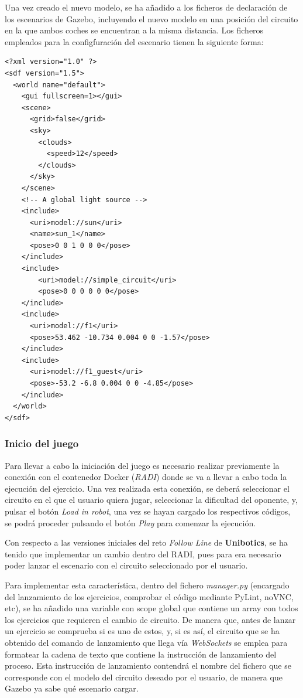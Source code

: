 \documentclass[a4paper, 12pt]{book}
\begin{document}
Una vez creado el nuevo modelo, se ha añadido a los ficheros de declaración de los escenarios de Gazebo, incluyendo el nuevo modelo en una posición del circuito en la que ambos coches se encuentran a la misma distancia. Los ficheros empleados para la configfuración del escenario tienen la siguiente forma:

\begin{lstlisting}
<?xml version="1.0" ?>
<sdf version="1.5">
  <world name="default">
    <gui fullscreen=1></gui>
    <scene>
      <grid>false</grid>
      <sky>
        <clouds>
          <speed>12</speed>
        </clouds>
      </sky>
    </scene>
    <!-- A global light source -->
    <include>
      <uri>model://sun</uri>
      <name>sun_1</name>
      <pose>0 0 1 0 0 0</pose>
    </include>
    <include>
	    <uri>model://simple_circuit</uri>
	    <pose>0 0 0 0 0 0</pose>
    </include>
    <include>
      <uri>model://f1</uri>
      <pose>53.462 -10.734 0.004 0 0 -1.57</pose>
    </include>
    <include>
      <uri>model://f1_guest</uri>
      <pose>-53.2 -6.8 0.004 0 0 -4.85</pose>
    </include>
  </world>
</sdf>
\end{lstlisting}


\subsubsection{Inicio del juego}
\label{subsec:follow_line_game_inicio}

Para llevar a cabo la iniciación del juego es necesario realizar previamente la conexión con el contenedor Docker (\emph{RADI}) donde se va a llevar a cabo toda la ejecución del ejercicio. Una vez realizada esta conexión, se deberá seleccionar el circuito en el que el usuario quiera jugar, seleccionar la dificultad del oponente, y, pulsar el botón \emph{Load in robot}, una vez se hayan cargado los respectivos códigos, se podrá proceder pulsando el botón \emph{Play} para comenzar la ejecución.

Con respecto a las versiones iniciales del reto \emph{Follow Line} de \textbf{Unibotics}, se ha tenido que implementar un cambio dentro del RADI, pues para era necesario poder lanzar el escenario con el circuito seleccionado por el usuario.

Para implementar esta característica, dentro del fichero \emph{manager.py} (encargado del lanzamiento de los ejercicios, comprobar el código mediante PyLint, noVNC, etc), se ha añadido una variable con scope global que contiene un array con todos los ejercicios que requieren el cambio de circuito. De manera que, antes de lanzar un ejercicio se comprueba si es uno de estos, y, si es así, el circuito que se ha obtenido del comando de lanzamiento que llega vía \emph{WebSockets} se emplea para formatear la cadena de texto que contiene la instrucción de lanzamiento del proceso. Esta instrucción de lanzamiento contendrá el nombre del fichero que se corresponde con el modelo del circuito deseado por el usuario, de manera que Gazebo ya sabe qué escenario cargar.
\end{document}
